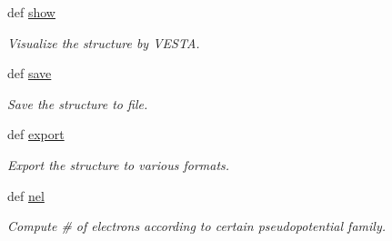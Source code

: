 \begin{DoxyCompactItemize}
def \hyperlink{classpycdft_1_1common_1_1sample_1_1Sample_a6cdbb7f2565ab65f18ddbd2292c6aa99}{show}
\begin{DoxyCompactList}\small\item\em Visualize the structure by V\-E\-S\-T\-A. \end{DoxyCompactList}\item 
def \hyperlink{classpycdft_1_1common_1_1sample_1_1Sample_a679389ec9fe11f70937955d3eb35313f}{save}
\begin{DoxyCompactList}\small\item\em Save the structure to file. \end{DoxyCompactList}\item 
def \hyperlink{classpycdft_1_1common_1_1sample_1_1Sample_ac10e9e09b66b0f1d22e5ba0efbbe779a}{export}
\begin{DoxyCompactList}\small\item\em Export the structure to various formats. \end{DoxyCompactList}\item 
def \hyperlink{classpycdft_1_1common_1_1sample_1_1Sample_afdd3ec05d1f1ab10aa99034281297cf2}{nel}
\begin{DoxyCompactList}\small\item\em Compute \# of electrons according to certain pseudopotential family. \end{DoxyCompactList}\end{DoxyCompactItemize}
